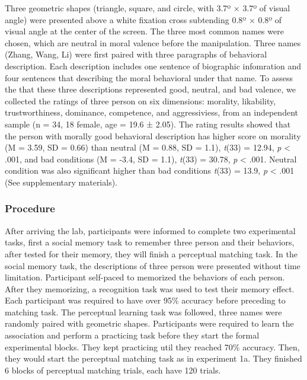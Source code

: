 \documentclass[man]{apa6}
\begin{document}
Three geometric shapes (triangle, square, and circle, with 3.7º × 3.7º of visual angle) were presented above a white fixation cross subtending 0.8º × 0.8º of visual angle at the center of the screen. The three most common names were chosen, which are neutral in moral valence before the manipulation.
Three names (Zhang, Wang, Li) were first paired with three paragraphs of behavioral description. Each description includes one sentence of biographic infomration and four sentences that describing the moral behavioral under that name. To assess the that these three descriptions represented good, neutral, and bad valence, we collected the ratings of three person on six dimensions: morality, likability, trustworthiness, dominance, competence, and aggressiviess, from an independent sample (n = 34, 18 female, age = 19.6 ± 2.05). The rating results showed that the person with morally good behavioral description has higher score on morality (M = 3.59, SD = 0.66) than neutral (M = 0.88, SD = 1.1), \emph{t}(33) = 12.94, \emph{p} \textless{} .001, and bad conditions (M = -3.4, SD = 1.1), \emph{t}(33) = 30.78, \emph{p} \textless{} .001. Neutral condition was also significant higher than bad conditions \emph{t}(33) = 13.9, \emph{p} \textless{} .001 (See supplementary materials).

\hypertarget{procedure-2}{%
\subsubsection{Procedure}\label{procedure-2}}

After arriving the lab, participants were informed to complete two experimental tasks, first a social memory task to remember three person and their behaviors, after tested for their memory, they will finish a perceptual matching task.
In the social memory task, the descriptions of three person were presented without time limitation. Participant self-paced to memorized the behaviors of each person. After they memorizing, a recognition task was used to test their memory effect. Each participant was required to have over 95\% accuracy before preceding to matching task.
The perceptual learning task was followed, three names were randomly paired with geometric shapes. Participants were required to learn the association and perform a practicing task before they start the formal experimental blocks. They kept practicing util they reached 70\% accuracy. Then, they would start the perceptual matching task as in experiment 1a. They finished 6 blocks of perceptual matching trials, each have 120 trials.
\end{document}
